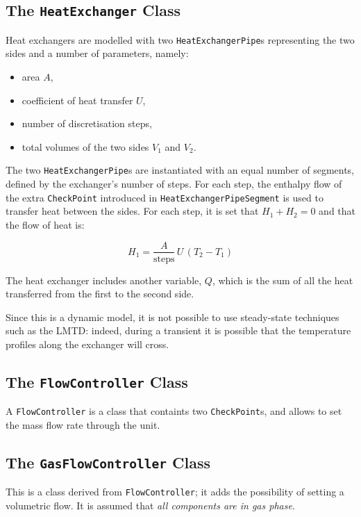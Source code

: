 \documentclass[a4paper]{article}
\begin{document}
\subsection{The \texttt{HeatExchanger} Class}
Heat exchangers are modelled with two \texttt{HeatExchangerPipe}s representing
the two sides and a number of parameters, namely:

\begin{itemize}
\item area $A$,
\item coefficient of heat transfer $U$,
\item number of discretisation steps,
\item total volumes of the two sides $V_1$ and $V_2$.
\end{itemize}

The two \texttt{HeatExchangerPipe}s are instantiated with an equal number of
segments, defined by the exchanger's number of steps. For each step, the
enthalpy flow of the extra \texttt{CheckPoint} introduced in
\texttt{HeatExchangerPipeSegment} is used to transfer heat between the sides.
For each step, it is set that $H_1+H_2=0$ and that the flow of heat is:

\begin{equation}
H_1 = \frac{A}{\text{steps}}\,U\,(T_2-T_1)
\end{equation}

The heat exchanger includes another variable, $Q$, which is the sum of all the
heat transferred from the first to the second side.

Since this is a dynamic model, it is not possible to use steady-state techniques
such as the LMTD: indeed, during a transient it is possible that the temperature
profiles along the exchanger will cross.


\subsection{The \texttt{FlowController} Class}
A \texttt{FlowController} is a class that containts two \texttt{CheckPoint}s,
and allows to set the mass flow rate through the unit.


\subsection{The \texttt{GasFlowController} Class}
This is a class derived from \texttt{FlowController}; it adds the possibility
of setting a volumetric flow. It is assumed that \emph{all components are in
gas phase}.
\end{document}
